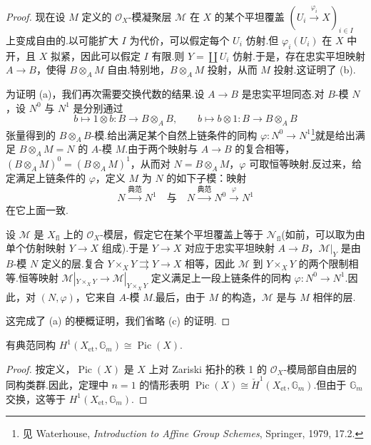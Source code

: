 \begin{proof}
现在设 $M$ 定义的 $\mathcal{O}_X$-模凝聚层 $\mathcal{M}$ 在 $X$ 的某个平坦覆盖 $(U_i \xrightarrow{\varphi_i} X)_{i \in I}$ 上变成自由的.以可能扩大 $I$ 为代价，可以假定每个 $U_i$ 仿射.但 $\varphi_i(U_i)$ 在 $X$ 中开，且 $X$ 拟紧，因此可以假定 $I$ 有限.则 $Y = \coprod U_i$ 仿射.于是，存在忠实平坦映射 $A \to B$，使得 $B \otimes_{A} M$ 自由.特别地，$B \otimes_{A} M$ 投射，从而 $M$ 投射.这证明了 (b).

为证明 (a)，我们再次需要交换代数的结果.设 $A \to B$ 是忠实平坦同态.对 $B$-模 $N$，设 $N^{0}$ 与 $N^{1}$ 是分别通过
\[
b \mapsto 1 \otimes b \colon B \to B \otimes_{A} B, \qquad b \mapsto b \otimes 1 \colon B \to B \otimes_{A} B
\]
张量得到的 $B \otimes_{A} B$-模.给出满足某个自然上链条件的同构 $\varphi \colon N^{0} \to N^{1}$\footnote{见 Waterhouse, \emph{Introduction to Affine Group Schemes}, Springer, 1979, 17.2.}就是给出满足 $B \otimes_{A} M = N$ 的 $A$-模 $M$.由于两个映射与 $A \to B$ 的复合相等，$(B \otimes_{A} M)^{0} = (B \otimes_{A} M)^{1}$，从而对 $N = B \otimes_{A} M$，$\varphi$ 可取恒等映射.反过来，给定满足上链条件的 $\varphi$，定义 $M$ 为 $N$ 的如下子模：映射
\[
N \xrightarrow{\text{典范}} N^{1} \quad \text{与} \quad N \xrightarrow{\text{典范}} N^{0} \xrightarrow{\varphi} N^{1}
\]
在它上面一致.

设 $\mathcal{M}$ 是 $X_{\mathrm{fl}}$ 上的 $\mathcal{O}_X$-模层，假定它在某个平坦覆盖上等于 $\mathcal{N}_{\mathrm{fl}}$(如前，可以取为由单个仿射映射 $Y \to X$ 组成).于是 $Y \to X$ 对应于忠实平坦映射 $A \to B$，$\mathcal{M}|_{Y}$ 是由 $B$-模 $N$ 定义的层.复合 $Y \times_{X} Y \rightrightarrows Y \to X$ 相等，因此 $\mathcal{M}$ 到 $Y \times_{X} Y$ 的两个限制相等.恒等映射 $\mathcal{M}|_{Y \times_{X} Y} \to \mathcal{M}|_{Y \times_{X} Y}$ 定义满足上一段上链条件的同构 $\varphi \colon N^{0} \to N^{1}$.因此，对 $(N, \varphi)$，它来自 $A$-模 $M$.最后，由于 $M$ 的构造，$\mathcal{M}$ 是与 $M$ 相伴的层.

这完成了 (a) 的梗概证明，我们省略 (c) 的证明.
\end{proof}

\begin{corollary}\label{cor:11.6}
有典范同构 $H^{1}(X_{\mathrm{et}}, \mathbb{G}_{m}) \cong \operatorname{Pic}(X)$.
\end{corollary}

\begin{proof}
按定义，$\operatorname{Pic}(X)$ 是 $X$ 上对 Zariski 拓扑的秩 1 的 $\mathcal{O}_X$-模局部自由层的同构类群.因此，定理中 $n = 1$ 的情形表明 $\operatorname{Pic}(X) \cong \check{H}^{1}(X_{\mathrm{et}}, \mathbb{G}_{m})$.但由于 $\mathbb{G}_{m}$ 交换，这等于 $H^{1}(X_{\mathrm{et}}, \mathbb{G}_{m})$.
\end{proof}

